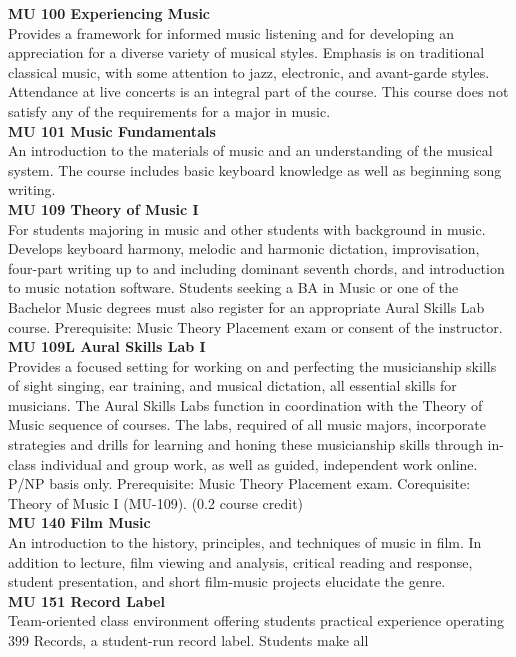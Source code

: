 \documentclass[
  letterpaper,
]{scrbook}
\begin{document}
\textbf{MU 100 Experiencing Music}\\
Provides a framework for informed music listening and for developing an
appreciation for a diverse variety of musical styles. Emphasis is on
traditional classical music, with some attention to jazz, electronic,
and avant-garde styles. Attendance at live concerts is an integral part
of the course. This course does not satisfy any of the requirements for
a major in music.\\
\textbf{MU 101 Music Fundamentals}\\
An introduction to the materials of music and an understanding of the
musical system. The course includes basic keyboard knowledge as well as
beginning song writing.\\
\textbf{MU 109 Theory of Music I}\\
For students majoring in music and other students with background in
music. Develops keyboard harmony, melodic and harmonic dictation,
improvisation, four-part writing up to and including dominant seventh
chords, and introduction to music notation software. Students seeking a
BA in Music or one of the Bachelor Music degrees must also register for
an appropriate Aural Skills Lab course. Prerequisite: Music Theory
Placement exam or consent of the instructor.\\
\textbf{MU 109L Aural Skills Lab I}\\
Provides a focused setting for working on and perfecting the
musicianship skills of sight singing, ear training, and musical
dictation, all essential skills for musicians. The Aural Skills Labs
function in coordination with the Theory of Music sequence of courses.
The labs, required of all music majors, incorporate strategies and
drills for learning and honing these musicianship skills through
in-class individual and group work, as well as guided, independent work
online. P/NP basis only. Prerequisite: Music Theory Placement exam.
Corequisite: Theory of Music I (MU-109). (0.2 course credit)\\
\textbf{MU 140 Film Music}\\
An introduction to the history, principles, and techniques of music in
film. In addition to lecture, film viewing and analysis, critical
reading and response, student presentation, and short film-music
projects elucidate the genre.\\
\textbf{MU 151 Record Label}\\
Team-oriented class environment offering students practical experience
operating 399 Records, a student-run record label. Students make all
\end{document}

